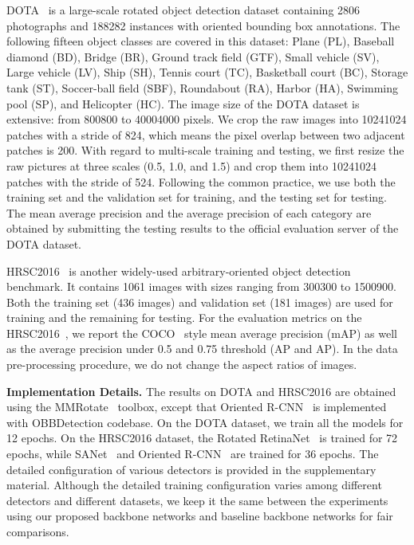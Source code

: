 DOTA~\cite{xia2018dota} is a large-scale rotated object detection dataset containing 2806 photographs and 188282 instances with oriented bounding box annotations. The following fifteen object classes are covered in this dataset: Plane (PL), Baseball diamond (BD), Bridge (BR), Ground track field (GTF), Small vehicle (SV), Large vehicle (LV), Ship (SH), Tennis court (TC), Basketball court (BC), Storage tank (ST), Soccer-ball field (SBF), Roundabout (RA), Harbor (HA), Swimming pool (SP), and Helicopter (HC). The image size of the DOTA dataset is extensive: from 800800 to 40004000 pixels. We crop the raw images into 10241024 patches with a stride of 824, which means the pixel overlap between two adjacent patches is 200. With regard to multi-scale training and testing, we first resize the raw pictures at three scales (0.5, 1.0, and 1.5) and crop them into 10241024 patches with the stride of 524. Following the common practice, we use both the training set and the validation set for training, and the testing set for testing. The mean average precision and the average precision of each category are obtained by submitting the testing results to the official evaluation server of the DOTA dataset.

HRSC2016~\cite{liu2016ship} is another widely-used arbitrary-oriented object detection benchmark. It contains 1061 images with sizes ranging from 300300 to 1500900. Both the training set (436 images) and validation set (181 images) are used for training and the remaining for testing. For the evaluation metrics on the HRSC2016~\cite{liu2016ship}, we report the COCO~\cite{lin2014microsoft} style mean average precision (mAP) as well as the average precision under 0.5 and 0.75 threshold (AP and AP). In the data pre-processing procedure, we do not change the aspect ratios of images.

{\bf Implementation Details.} The results on DOTA and HRSC2016 are obtained  using the MMRotate~\cite{zhou2022mmrotate} toolbox, except that Oriented R-CNN~\cite{xie2021oriented} is implemented with OBBDetection codebase. On the DOTA dataset, we train all the models for 12 epochs. On the HRSC2016 dataset, the Rotated RetinaNet~\cite{lin2017focal} is trained for 72 epochs, while SANet~\cite{han2021align} and Oriented R-CNN~\cite{xie2021oriented} are trained for 36 epochs. The detailed configuration of various detectors is provided in the supplementary material. Although the detailed training configuration varies among different detectors and different datasets, we keep it the same between the experiments using our proposed backbone networks and baseline backbone networks for fair comparisons.



